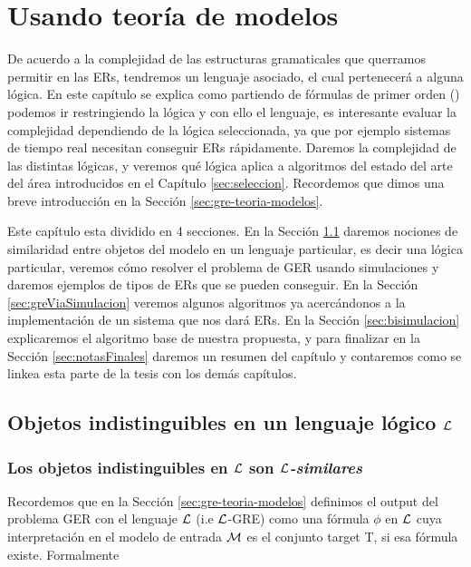\chapter{Usando teor\'ia de modelos}
\label{sec:intro_logica}

De acuerdo a la complejidad de las estructuras gramaticales que querramos permitir en las ERs, tendremos un lenguaje asociado, 
el cual pertenecer\'a a alguna l\'ogica. En este cap\'itulo se explica como partiendo de f\'ormulas de primer orden (\FOL) 
podemos ir restringiendo la l\'ogica y con ello el lenguaje, es interesante evaluar la complejidad dependiendo de la l\'ogica seleccionada, 
ya que por ejemplo sistemas de tiempo real necesitan conseguir ERs r\'apidamente. Daremos la complejidad de las distintas l\'ogicas, 
y veremos qu\'e l\'ogica aplica a algoritmos del estado del arte del \'area introducidos en el Cap\'itulo \ref{sec:seleccion}. Recordemos que dimos una breve introducci\'on en la Secci\'on \ref{sec:gre-teoria-modelos}.

Este cap\'itulo esta dividido en 4 secciones. En la Secci\'on \ref{sec:seleccionandoLenguaje} daremos nociones de similaridad entre objetos del modelo en un lenguaje particular, es decir una l\'ogica particular, veremos c\'omo resolver el problema de GER usando simulaciones y daremos ejemplos 
de tipos de ERs que se pueden conseguir. En la Secci\'on \ref{sec:greViaSimulacion} veremos 
algunos algoritmos ya acerc\'andonos a la implementaci\'on de un sistema que nos dar\'a ERs. En la Secci\'on \ref{sec:bisimulacion} 
explicaremos el algoritmo base de nuestra propuesta, y para finalizar en la Secci\'on \ref{sec:notasFinales} daremos un resumen del cap\'itulo y contaremos como se linkea esta parte de la tesis con los dem\'as cap\'itulos.


\section{Objetos indistinguibles en un lenguaje l\'ogico $\mathcal{L}$}
\label{sec:seleccionandoLenguaje}


\subsection{Los objetos indistinguibles en $\mathcal{L}$ son \emph{$\mathcal{L}$-similares}}
\label{sec:indistinguibles}

Recordemos que en la Secci\'on \ref{sec:gre-teoria-modelos} definimos el output del problema GER con el lenguaje $\mathcal{L}$ (i.e $\mathcal{L}$-GRE) como una f\'ormula $\phi$ en $\mathcal{L}$ cuya interpretaci\'on en el modelo de entrada  $\mathcal{M}$ es el conjunto target T, si esa f\'ormula existe. Formalmente

